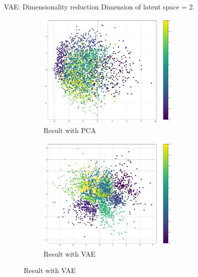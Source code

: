 \documentclass[11pt]{beamer} %
\begin{document}
\begin{frame}{VAE: Dimensionality reduction}
Dimension of latent space = 2.
\begin{figure}
    \centering
    \begin{subfigure}[h]{0.46\linewidth}
        \centering
        \includegraphics[width=0.75\textwidth]{img/dimreduce_pca.png}
        \caption{Result with PCA}
    \end{subfigure}
    \begin{subfigure}[h]{0.46\linewidth}
        \centering
        \includegraphics[width=0.75\textwidth]{img/dimreduce_vae.png}
        \caption{Result with VAE}
    \end{subfigure}
\end{figure}
\end{frame}
\end{document}
